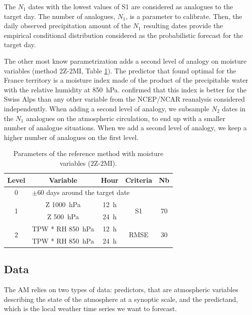 \documentclass[5p]{elsarticle}
\begin{document}
The $N_{1}$ dates with the lowest values of S1 are considered as analogues to the target day. The number of analogues, $N_{1}$, is a parameter to calibrate. Then, the daily observed precipitation amount of the $N_{1}$ resulting dates provide the empirical conditional distribution considered as the probabilistic forecast for the target day.

The other most know parametrization adds a second level of analogy on moisture variables (method 2Z-2MI, Table \ref{table:params_R2}). The predictor that \citet{Bontron2004} found optimal for the France territory is a moisture index made of the product of the precipitable water with the relative humidity at 850~hPa. \cite{Horton2012a} confirmed that this index is better for the Swiss Alps than any other variable from the NCEP/NCAR reanalysis considered independently. When adding a second level of analogy, we subsample $N_{2}$ dates in the $N_{1}$ analogues on the atmospheric circulation, to end up with a smaller number of analogue situations. When we add a second level of analogy, we keep a higher number of analogues on the first level.

\begin{table}[htbp]
	\caption{Parameters of the reference method with moisture variables (2Z-2MI).}
	\footnotesize
	\begin{center}
		\begin{tabular}{ccccc}
			\hline 
			Level & Variable & Hour & Criteria & Nb \\ 
			\hline 
			0 & \multicolumn{4}{l}{$\pm 60$ days around the target date} \\
			\hline 
			\multirow{2}{*}{1} & Z 1000~hPa & 12~h & \multirow{2}{*}{S1} & \multirow{2}{*}{70} \\
			& Z 500~hPa & 24~h & & \\ 
			\hline
			\multirow{2}{*}{2} & TPW * RH 850~hPa & 12~h & \multirow{2}{*}{RMSE} & \multirow{2}{*}{30} \\
			& TPW * RH 850~hPa & 24~h & & \\ 
			\hline 
		\end{tabular} 
	\end{center}
	\label{table:params_R2}
\end{table}


\subsection{Data}
\label{sec:data}

The AM relies on two types of data: predictors, that are atmospheric variables describing the state of the atmosphere at a synoptic scale, and the predictand, which is the local weather time series we want to forecast.
\end{document}
